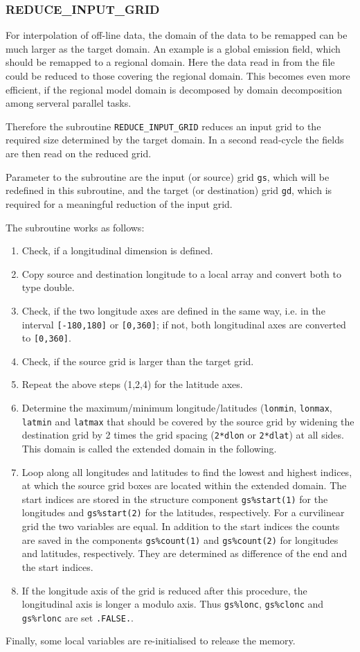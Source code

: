 \documentclass[11pt,twoside]{article}
\begin{document}
\subsubsection{REDUCE\_INPUT\_GRID\label{REDINPGRID}}
For interpolation of off-line data, the domain of the data to be
remapped can be much larger as the target domain. An example is a
global emission field, which should be remapped to a regional
domain. Here the data read in from the file could be reduced to those
covering the regional domain. This becomes even more efficient,
if the regional model domain is decomposed by domain decomposition
among serveral parallel tasks.

Therefore the subroutine \verb|REDUCE_INPUT_GRID|
reduces an input grid to the required size determined by the target
domain. In a second read-cycle the fields are then read on the reduced grid. 


Parameter to the subroutine are the input (or source) grid \verb|gs|,
which will be redefined in this subroutine, and the target (or
destination) grid \verb|gd|, which is required for a meaningful
reduction of the  input grid. 


The subroutine works as follows:
\begin{enumerate}
\item Check, if a longitudinal dimension is defined.
\item Copy source and destination longitude to a local array and convert both to
type double.
\item Check, if the two longitude axes are defined in the same way, i.e. in
the interval \verb|[-180,180]| or \verb|[0,360]|; if not, both longitudinal
axes are converted to \verb|[0,360]|.
\item Check, if the source grid is larger than the target grid.
\item Repeat the above steps (1,2,4) for the latitude axes.
\item Determine the maximum/minimum longitude/latitudes
(\verb|lonmin|, \verb|lonmax|, \verb|latmin| and \verb|latmax| that
should be 
covered by the source grid by widening the destination grid by  2 times the grid
spacing (\verb|2*dlon| or \verb|2*dlat|) at all sides. This domain is called
the extended domain in the following.
\item Loop along all longitudes and latitudes to find the lowest and highest
indices, at which the source grid boxes are located within the
extended domain. The start indices  are stored in the structure
component \verb|gs%start(1)| for the longitudes and \verb|gs%start(2)|
for the latitudes, respectively. For a curvilinear grid the two
variables are equal. 
In addition to the start indices the counts are saved in the
components \verb|gs%count(1)| and \verb|gs%count(2)| for longitudes
 and latitudes, 
 respectively. They are determined as difference of the end and the start
 indices. 
\item If the longitude axis of the grid is reduced after this
procedure, the longitudinal axis is longer a modulo
axis. Thus \verb|gs%lonc|, \verb|gs%clonc| and \verb|gs%rlonc| are
set \verb|.FALSE.|. 

\end{enumerate}
Finally, some local variables are re-initialised to release the memory.
\end{document}
